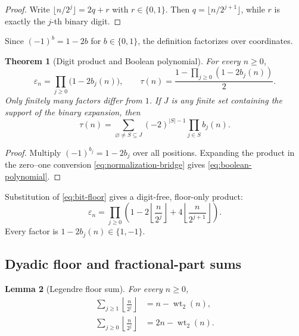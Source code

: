 \documentclass[11pt,oneside]{article}
\numberwithin{equation}{section}
\newtheorem{theorem}{Theorem}[section]
\newtheorem{lemma}[theorem]{Lemma}
\theoremstyle{definition}
\theoremstyle{remark}
\newcommand{\wt}{\operatorname{wt}_2}
\newcommand{\eps}{\varepsilon}
\begin{document}
\begin{proof}
Write \(\lfloor n/2^j\rfloor=2q+r\) with \(r\in\{0,1\}\).  Then
\(q=\lfloor n/2^{j+1}\rfloor\), while \(r\) is exactly the \(j\)-th binary
digit.
\end{proof}

Since \((-1)^b=1-2b\) for \(b\in\{0,1\}\), the definition factorizes over
coordinates.

\begin{theorem}[Digit product and Boolean polynomial]
\label{thm:digit-product}
For every \(n\ge0\),
\begin{equation}
  \boxed{
  \eps_n=\prod_{j\ge0}\bigl(1-2b_j(n)\bigr),
  \qquad
  \tau(n)=\frac{1-\prod_{j\ge0}(1-2b_j(n))}{2}.}
  \label{eq:digit-product}
\end{equation}
Only finitely many factors differ from \(1\).  If \(J\) is any finite set
containing the support of the binary expansion, then
\begin{equation}
  \boxed{
  \tau(n)=\sum_{\varnothing\ne S\subseteq J}
     (-2)^{|S|-1}\prod_{j\in S}b_j(n).}
  \label{eq:boolean-polynomial}
\end{equation}
\end{theorem}

\begin{proof}
Multiply \((-1)^{b_j}=1-2b_j\) over all positions.  Expanding the product in
the zero--one conversion \eqref{eq:normalization-bridge} gives
\eqref{eq:boolean-polynomial}.
\end{proof}

Substitution of \eqref{eq:bit-floor} gives a digit-free, floor-only product:
\begin{equation}
  \eps_n=
  \prod_{j\ge0}
  \left(
    1-2\left\lfloor\frac{n}{2^j}\right\rfloor
      +4\left\lfloor\frac{n}{2^{j+1}}\right\rfloor
  \right).
  \label{eq:pure-floor-product}
\end{equation}
Every factor is \(1-2b_j(n)\in\{1,-1\}\).

\subsection{Dyadic floor and fractional-part sums}

\begin{lemma}[Legendre floor sum]
\label{lem:floor-sum}
For every \(n\ge0\),
\begin{align}
  \sum_{j\ge1}\left\lfloor\frac{n}{2^j}\right\rfloor
   &=n-\wt(n),
  \label{eq:floor-sum}\\
  \sum_{j\ge0}\left\lfloor\frac{n}{2^j}\right\rfloor
   &=2n-\wt(n).
  \label{eq:floor-sum-all}
\end{align}
\end{lemma}
\end{document}

